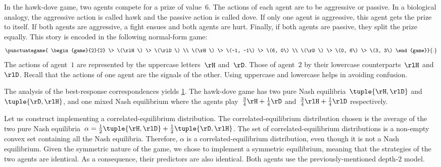 In the hawk-dove game, two agents compete for a prize of value~\(6\).
The actions of each agent are to be aggressive or passive.
In a biological analogy, the aggressive action is called hawk and the passive action is called dove.
If only one agent is aggressive, this agent gets the prize to itself.
If both agents are aggressive, a fight ensues and both agents are hurt.
Finally, if both agents are passive, they split the prize equally.
This story is encoded in the following normal-form game:
\begin{equation*}
\punctuategame{
\begin{game}{2}{2}
        \> \(\rlH\)   \> \(\rlD\)  \\
\(\rH\) \> \(-1, -1\) \> \(6, 0\) \\
\(\rD\) \> \(0, 6\)   \> \(3, 3\)
\end{game}}
{.}\bigskip
\end{equation*}
The actions of agent~\(1\) are represented by the uppercase letters~\(\rH\) and~\(\rD\).
Those of agent~\(2\) by their lowercase counterparts~\(\rlH\) and~\(\rlD\).
Recall that the actions of one agent are the signals of the other.
Using uppercase and lowercase helps in avoiding confusion.

The analysis of the best-response correspondences yields \cref{fig:hawk-dove_best_response}.
The hawk-dove game has two pure Nash equilibria~\(\tuple{\rH, \rlD}\) and~\(\tuple{\rD, \rlH}\), and one mixed Nash equilibrium where the agents play~\(\frac{3}{4} \rH + \frac{1}{4} \rD\) and~\(\frac{3}{4} \rlH + \frac{1}{4} \rlD\) respectively.

\begin{figure}[htp]
\centering
{}
\label{fig:hawk-dove_best_response}
\end{figure}

Let us construct  implementing a correlated-equilibrium distribution.
The correlated-equilibrium distribution chosen is the average of the two pure Nash equilibria~\(\alpha = \frac{1}{2} \tuple{\rH, \rlD} + \frac{1}{2} \tuple{\rD, \rlH}\).
The set of correlated-equilibrium distributions is a non-empty convex set containing all the Nash equilibria.
Therefore, \(\alpha\) is a correlated-equilibrium distribution, even though it is not a Nash equilibrium.
Given the symmetric nature of the game, we chose to implement a symmetric equilibrium, meaning that the strategies of the two agents are identical.
As a consequence, their predictors are also identical.
Both agents use the previously-mentioned depth-\(2\) model.

